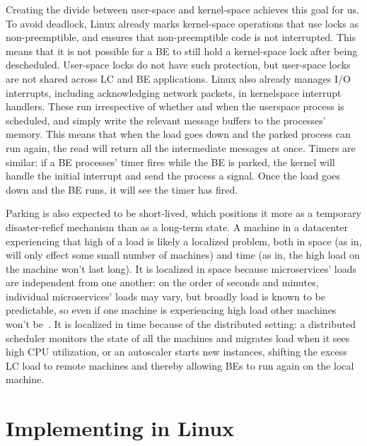 Creating the divide between user-space and kernel-space achieves this goal for
us. To avoid deadlock, Linux already marks kernel-space operations that use
locks as non-preemptible, and ensures that non-preemptible code is not
interrupted. This means that it is not possible for a BE to still hold a
kernel-space lock after being descheduled. User-space locks do not have such
protection, but user-space locks are not shared across LC and BE applications.
Linux also already manages I/O interrupts, including acknowledging network
packets, in kernelspace interrupt handlers. These run irrespective of whether
and when the userspace process is scheduled, and simply write the relevant
message buffers to the processes' memory. This means that when the load goes
down and the parked process can run again, the read will return all the
intermediate messages at once. Timers are similar: if a BE processes' timer
fires while the BE is parked, the kernel will handle the initial interrupt and
send the process a signal. Once the load goes down and the BE runs, it will see
the timer has fired.

Parking is also expected to be short-lived, which positions it more as a
temporary disaster-refief mechanism than as a long-term state. A machine in a datacenter experiencing that high of a load is
likely a localized problem, both in space (as in, will only effect some small
number of machines) and time (as in, the high load on the machine won't last
long). It is localized in space because microservices' loads are independent
from one another: on the order of seconds and minutes, individual microservices'
loads may vary, but broadly load is known to be predictable, so even if one
machine is experiencing high load other machines won't be~\cite{TODO}. It is
localized in time because of the distributed setting: a distributed scheduler
monitors the state of all the machines and migrates load when it sees high CPU
utilization, or an autoscaler starts new instances, shifting the excess LC load
to remote machines and thereby allowing BEs to run again on the local machine.


\section{Implementing \beclass{} in Linux}\label{s:implementation}

